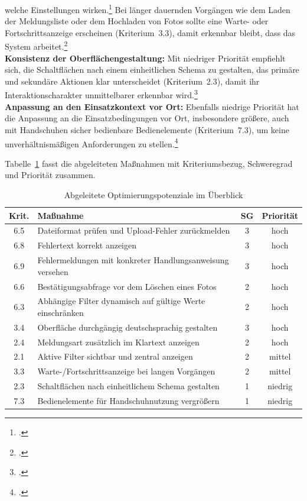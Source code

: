 welche Einstellungen
wirken.\footcite[Vgl.][Abschnitt~5.2.2.2]{DIN_ISO_9241-110:2020}
Bei länger dauernden Vorgängen wie dem Laden der Meldungsliste oder dem Hochladen
von Fotos sollte eine Warte- oder Fortschrittsanzeige erscheinen (Kriterium~3.3),
damit erkennbar bleibt, dass das System
arbeitet.\footcite[Vgl.][Abschnitt~5.3.2.4]{DIN_ISO_9241-110:2020}\\
\textbf{Konsistenz der Oberflächengestaltung:}
Mit niedriger Priorität empfiehlt sich, die Schaltflächen nach einem einheitlichen
Schema zu gestalten, das primäre und sekundäre Aktionen klar unterscheidet
(Kriterium~2.3), damit ihr Interaktionscharakter unmittelbarer erkennbar
wird.\footcite[Vgl.][Abschnitt~5.2.2.4]{DIN_ISO_9241-110:2020}\\
\textbf{Anpassung an den Einsatzkontext vor Ort:}
Ebenfalls niedrige Priorität hat die Anpassung an die Einsatzbedingungen vor Ort,
insbesondere größere, auch mit Handschuhen sicher bedienbare Bedienelemente
(Kriterium~7.3), um keine unverhältnismäßigen Anforderungen zu
stellen.\footcite[Vgl.][Abschnitt~5.7.2.7]{DIN_ISO_9241-110:2020}

Tabelle~\ref{tab:optimierung} fasst die abgeleiteten Maßnahmen mit
Kriteriumsbezug, Schweregrad und Priorität zusammen.

\begin{table}[htbp]
\centering
\caption{Abgeleitete Optimierungspotenziale im Überblick}
\label{tab:optimierung}
{\footnotesize
\begin{tabularx}{\textwidth}{|c|>{\RaggedRight}X|c|c|}
\hline
\textbf{Krit.} & \textbf{Maßnahme} & \textbf{SG} & \textbf{Priorität} \\\hline
6.5 & Dateiformat prüfen und Upload-Fehler zurückmelden & 3 & hoch \\\hline
6.8 & Fehlertext korrekt anzeigen & 3 & hoch \\\hline
6.9 & Fehlermeldungen mit konkreter Handlungsanweisung versehen & 3 & hoch \\\hline
6.6 & Bestätigungsabfrage vor dem Löschen eines Fotos & 2 & hoch \\\hline
6.3 & Abhängige Filter dynamisch auf gültige Werte einschränken & 2 & hoch \\\hline
3.4 & Oberfläche durchgängig deutschsprachig gestalten & 3 & hoch \\\hline
2.4 & Meldungsart zusätzlich im Klartext anzeigen & 2 & hoch \\\hline
2.1 & Aktive Filter sichtbar und zentral anzeigen & 2 & mittel \\\hline
3.3 & Warte-/Fortschrittsanzeige bei langen Vorgängen & 2 & mittel \\\hline
2.3 & Schaltflächen nach einheitlichem Schema gestalten & 1 & niedrig \\\hline
7.3 & Bedienelemente für Handschuhnutzung vergrößern & 1 & niedrig \\\hline
\end{tabularx}
}
\end{table}
